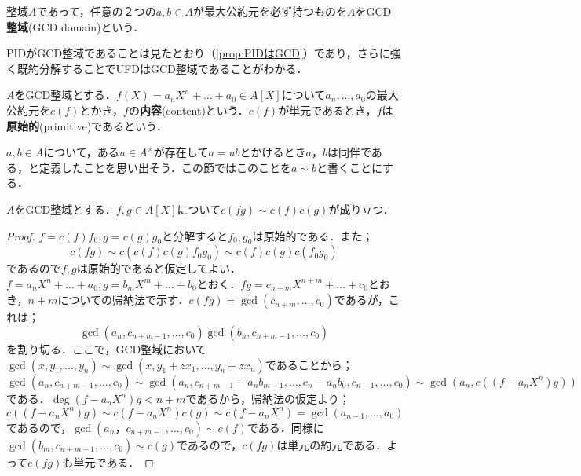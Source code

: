 \begin{defi}[GCD整域]\label{defi:GCDdomain}
	整域$A$であって，任意の２つの$a,b\in A$が最大公約元を必ず持つものを$A$をGCD\textbf{整域}(GCD domain)という．
\end{defi}

PIDがGCD整域であることは見たとおり（\ref{prop:PIDはGCD}）であり，さらに強く既約分解することでUFDはGCD整域であることがわかる．

\begin{defi}[内容，原始多項式]
	$A$をGCD整域とする．$f(X)=a_nX^n+\dots+a_0\in A[X]$について$a_n,\dots,a_0$の最大公約元を$c(f)$とかき，$f$の\textbf{内容}(content)という．$c(f)$が単元であるとき，$f$は\textbf{原始的}(primitive)であるという．
\end{defi}

$a,b\in A$について，ある$u\in A^\times$が存在して$a=ub$とかけるとき$a，b$は同伴である，と定義したことを思い出そう．この節ではこのことを$a\sim b$と書くことにする．
\begin{lem}[Gaussの補題]
	$A$をGCD整域とする．$f,g\in A[X]$について$c(fg)\sim c(f)c(g)$が成り立つ．
\end{lem}

\begin{proof}
	$f=c(f)f_0,g=c(g)g_0$と分解すると$f_0,g_0$は原始的である．また；
	\[c(fg)\sim c(c(f)c(g)f_0g_0)\sim c(f)c(g)c(f_0g_0)\]
	であるので$f,g$は原始的であると仮定してよい．$f=a_nX^n+\dots+a_0,g=b_mX^m+\dots+b_0$とおく．$fg=c_{n+m}X^{n+m}+\dots+c_0$とおき，$n+m$についての帰納法で示す．$c(fg)=\gcd(c_{n+m},\dots,c_0)$であるが，これは；
	\[\gcd(a_n,c_{n+m-1},\dots, c_0)\gcd(b_n,c_{n+m-1},\dots,c_0)\]
	を割り切る．ここで，GCD整域において$\gcd(x,y_1,\dots,y_n)\sim\gcd(x,y_1+zx_1,\dots,y_n+zx_n)$であることから；
	\[\gcd(a_n,c_{n+m-1},\dots,c_0)\sim\gcd(a_n,c_{n+m-1}-a_nb_{m-1},\dots,c_n-a_nb_0,c_{n-1},\dots,c_0)\sim\gcd(a_n, c((f-a_nX^n)g))\]
	である．$\deg(f-a_nX^n)g<n+m$であるから，帰納法の仮定より；
	\[c((f-a_nX^n)g)\sim c(f-a_nX^n)c(g)\sim c(f-a_nX^n)=\gcd(a_{n-1},\dots,a_0)\]
	であるので，$\gcd(a_n，c_{n+m-1},\dots,c_0)\sim c(f)$である．同様に$\gcd(b_m,c_{n+m-1},\dots,c_0)\sim c(g)$であるので，$c(fg)$は単元の約元である．よって$c(fg)$も単元である．
\end{proof}

